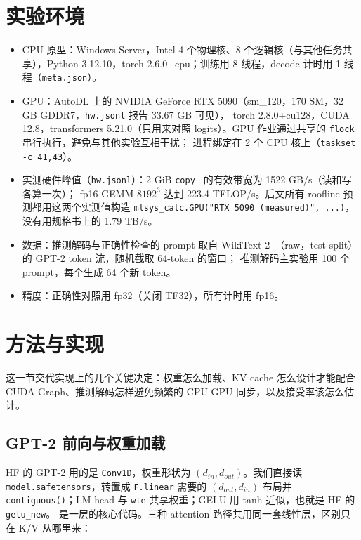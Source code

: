 \documentclass[11pt,a4paper]{ctexart}
\begin{document}
\section{实验环境}

\begin{itemize}
  \item CPU 原型：Windows Server，Intel 4 个物理核、8 个逻辑核（与其他任务共享），Python 3.12.10，torch 2.6.0+cpu；训练用 8 线程，decode 计时用 1 线程（\texttt{meta.json}）。
  \item GPU：AutoDL 上的 NVIDIA GeForce RTX 5090（sm\_120，170 SM，32 GB GDDR7，\texttt{hw.jsonl} 报告 33.67 GB 可见），
        torch 2.8.0+cu128，CUDA 12.8，transformers 5.21.0（只用来对照 logits）。GPU 作业通过共享的 \texttt{flock} 串行执行，避免与其他实验互相干扰；
        进程绑定在 2 个 CPU 核上（\texttt{taskset -c 41,43}）。
  \item 实测硬件峰值（\texttt{hw.jsonl}）：2 GiB \texttt{copy\_} 的有效带宽为 1522 GB/s（读和写各算一次）；
        fp16 GEMM $8192^3$ 达到 223.4 TFLOP/s。后文所有 roofline 预测都用这两个实测值构造
        \texttt{mlsys\_calc.GPU("RTX 5090 (measured)", ...)}，没有用规格书上的 1.79 TB/s。
  \item 数据：推测解码与正确性检查的 prompt 取自 WikiText-2~\cite{wikitext}（raw，test split）的 GPT-2 token 流，随机截取 64-token 的窗口；
        推测解码主实验用 100 个 prompt，每个生成 64 个新 token。
  \item 精度：正确性对照用 fp32（关闭 TF32），所有计时用 fp16。
\end{itemize}

\section{方法与实现}

这一节交代实现上的几个关键决定：权重怎么加载、KV cache 怎么设计才能配合 CUDA Graph、推测解码怎样避免频繁的 CPU-GPU 同步，以及接受率该怎么估计。

\subsection{GPT-2 前向与权重加载}
HF 的 GPT-2 用的是 \texttt{Conv1D}，权重形状为 $(d_{in}, d_{out})$。我们直接读 \texttt{model.safetensors}，转置成 \texttt{F.linear} 需要的
$(d_{out}, d_{in})$ 布局并 \texttt{contiguous()}；LM head 与 \texttt{wte} 共享权重；GELU 用 tanh 近似，也就是 HF 的 \texttt{gelu\_new}。
 是一层的核心代码。三种 attention 路径共用同一套线性层，区别只在 K/V 从哪里来：
\end{document}
